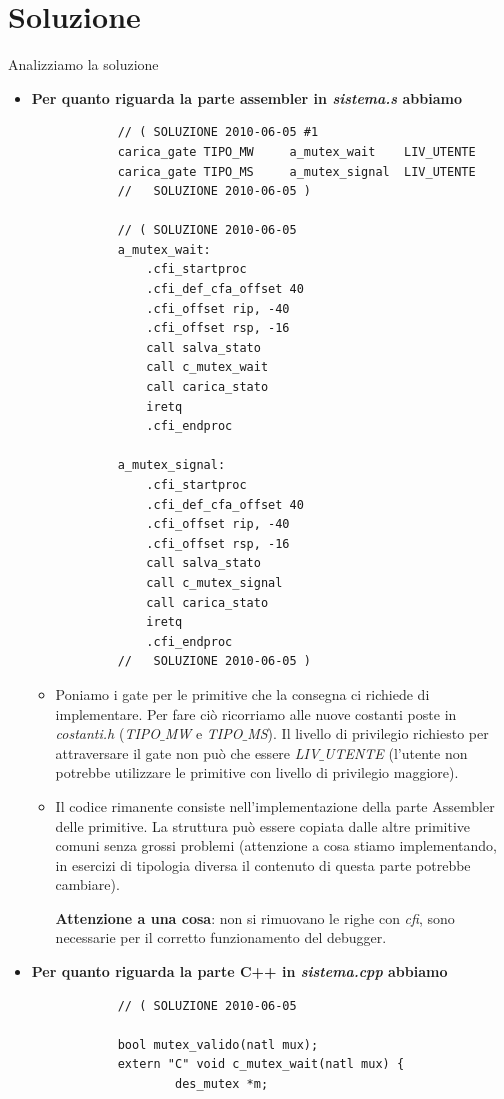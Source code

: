 \documentclass[11pt]{report}
\theoremstyle{definition}
\begin{document}
\section*{Soluzione}
Analizziamo la soluzione
	\begin{itemize} 
		\item \textbf{Per quanto riguarda la parte assembler in \emph{sistema.s} abbiamo }
		\begin{verbatim}
			// ( SOLUZIONE 2010-06-05 #1
			carica_gate	TIPO_MW		a_mutex_wait	LIV_UTENTE
			carica_gate	TIPO_MS		a_mutex_signal	LIV_UTENTE
			//   SOLUZIONE 2010-06-05 )
			
			// ( SOLUZIONE 2010-06-05
			a_mutex_wait:
			    .cfi_startproc
			    .cfi_def_cfa_offset 40
			    .cfi_offset rip, -40
			    .cfi_offset rsp, -16
			    call salva_stato
			    call c_mutex_wait
			    call carica_stato
			    iretq
			    .cfi_endproc
			
			a_mutex_signal:
			    .cfi_startproc
		    	.cfi_def_cfa_offset 40
			    .cfi_offset rip, -40
			    .cfi_offset rsp, -16
			    call salva_stato
			    call c_mutex_signal
			    call carica_stato
			    iretq
			    .cfi_endproc
			//   SOLUZIONE 2010-06-05 )
		\end{verbatim}
		\begin{itemize}
			\item Poniamo i gate per le primitive che la consegna ci richiede di implementare. Per fare ciò ricorriamo alle nuove costanti poste in \emph{costanti.h} (\emph{TIPO$\_$MW} e \emph{TIPO$\_$MS}). Il livello di privilegio richiesto per attraversare il gate non può che essere \emph{LIV$\_$UTENTE} (l'utente non potrebbe utilizzare le primitive con livello di privilegio maggiore).
			\item Il codice rimanente consiste nell'implementazione della parte Assembler delle primitive. La struttura può essere copiata dalle altre primitive comuni senza grossi problemi (attenzione a cosa stiamo implementando, in esercizi di tipologia diversa il contenuto di questa parte potrebbe cambiare).
			
			\textbf{Attenzione a una cosa}: non si rimuovano le righe con \emph{cfi}, sono necessarie per il corretto funzionamento del debugger.
		\end{itemize}
		\item \textbf{Per quanto riguarda la parte C++ in \emph{sistema.cpp} abbiamo}
		\begin{verbatim}
			// ( SOLUZIONE 2010-06-05 
			
			bool mutex_valido(natl mux);
			extern "C" void c_mutex_wait(natl mux) {
				    des_mutex *m;
				

\end{verbatim}
\end{itemize}
\end{document}
